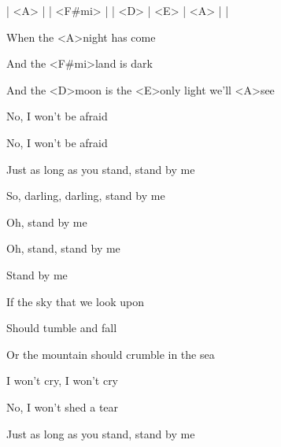 

\ifdefined\TPBAND
 | <A> | | <F#mi> | | <D> | <E> | <A> | |
\fi

\zs
When the <A>night has come

And the <F#mi>land is dark

And the <D>moon is the <E>only light we'll <A>see

No, I won't be afraid

No, I won't be afraid

Just as long as you stand, stand by me
\ks

\zr
So, darling, darling, stand by me

Oh, stand by me

Oh, stand, stand by me

Stand by me
\kr

\zs
If the sky that we look upon

Should tumble and fall

Or the mountain should crumble in the sea

I won't cry, I won't cry

No, I won't shed a tear

Just as long as you stand, stand by me
\ks

\kp
